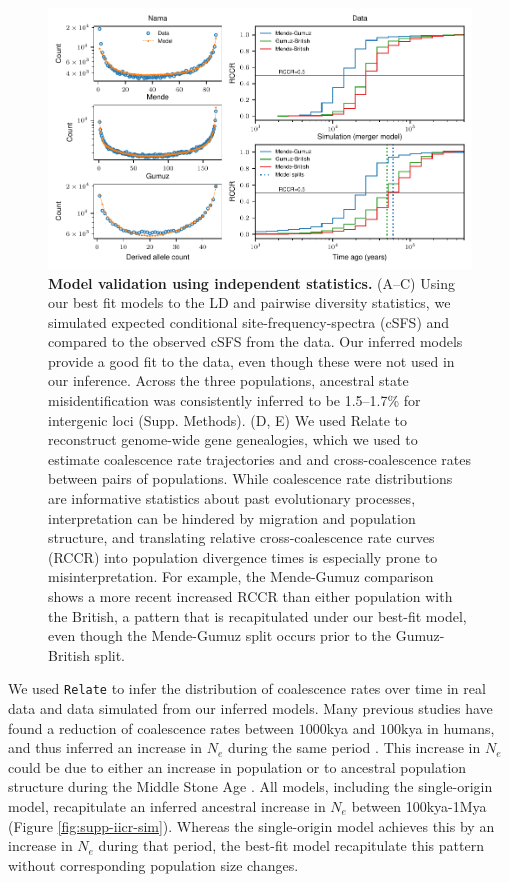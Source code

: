 \documentclass[]{article}
\begin{document}
\begin{figure}[t!]
    \centering
    \includegraphics{figures/fig4}
    \caption{
        \textbf{Model validation using independent statistics.} (A--C) Using
        our best fit models to the LD and pairwise diversity statistics, we
        simulated expected conditional site-frequency-spectra (cSFS) and
        compared to the observed cSFS from the data. Our inferred models
        provide a good fit to the data, even though these were not used in our
        inference. Across the three populations, ancestral state
        misidentification was consistently inferred to be 1.5--1.7\% for
        intergenic loci (Supp. Methods). (D, E) We used Relate
        \citep{Speidel2019-nj} to reconstruct genome-wide gene genealogies,
        which we used to estimate coalescence rate trajectories and
        and cross-coalescence rates between pairs of populations. While
        coalescence rate distributions are informative statistics about past
        evolutionary processes, interpretation can be hindered by migration and
        population structure, and translating relative cross-coalescence rate
        curves (RCCR) into population divergence times is especially prone
        to misinterpretation. For example, the Mende-Gumuz comparison shows
        a more recent increased RCCR than either population with the British,
        a pattern that is recapitulated under our best-fit model, even though
        the Mende-Gumuz split occurs prior to the Gumuz-British split.
    }
    \label{fig:4}
\end{figure}

We used \texttt{Relate} \citep{Speidel2019-nj} to infer the distribution of
coalescence rates over time in real data and data simulated from our inferred models. Many 
previous studies have found a reduction of coalescence rates 
between $1000$kya and $100$kya in humans, and thus inferred an increase 
in $N_e$ during the same period \citep{Li2011-le}.
This increase in $N_e$ could be due to either an increase in population or to 
ancestral population structure during the Middle Stone Age \citep{Mazet2016-wn}.
All models, including the
single-origin model, recapitulate an inferred ancestral
increase in $N_e$ between 100kya-1Mya (Figure \ref{fig:supp-iicr-sim}). Whereas the single-origin model achieves this by
an increase in $N_e$ during that period, the best-fit model recapitulate this pattern without corresponding population size changes.      
\end{document}
